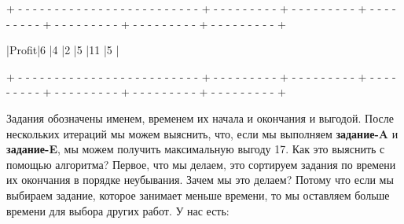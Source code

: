 \begin{tcolorbox}
{\tiny{+ - - - - - - - - - - - - - - - - - - - - - - - - - + - - - - - - - - - + - - - - - - - - - + - - - - - - - - - + - - - - - - - - - + - - - - - - - - - + - - - - - - - - - +}}

\hspace{0.4mm}|\hspace{17.6mm}Profit\hspace{17.6mm}|\hspace{7.1mm}6\hspace{7.1mm} |\hspace{7.1mm}4\hspace{7.1mm} |\hspace{7.1mm}2\hspace{7.1mm} |\hspace{7.1mm}5\hspace{7.1mm} |\hspace{5.8mm}11\hspace{5.8mm} |\hspace{7.1mm}5\hspace{7.1mm} |

{\tiny{+ - - - - - - - - - - - - - - - - - - - - - - - - - + - - - - - - - - - + - - - - - - - - - + - - - - - - - - - + - - - - - - - - - + - - - - - - - - - + - - - - - - - - - +}}
\end{tcolorbox}

\vspace{\baselineskip}
Задания обозначены именем, временем их начала и окончания и выгодой. После нескольких итераций мы можем выяснить, что, если мы выполняем {\bfseries задание-A} и {\bfseries задание-E}, мы можем получить максимальную выгоду 17. Как это выяснить с помощью алгоритма? Первое, что мы делаем, это сортируем задания по времени их окончания в порядке неубывания. Зачем мы это делаем? Потому что если мы выбираем задание, которое занимает меньше времени, то мы оставляем больше времени для выбора других работ. У нас есть: 

